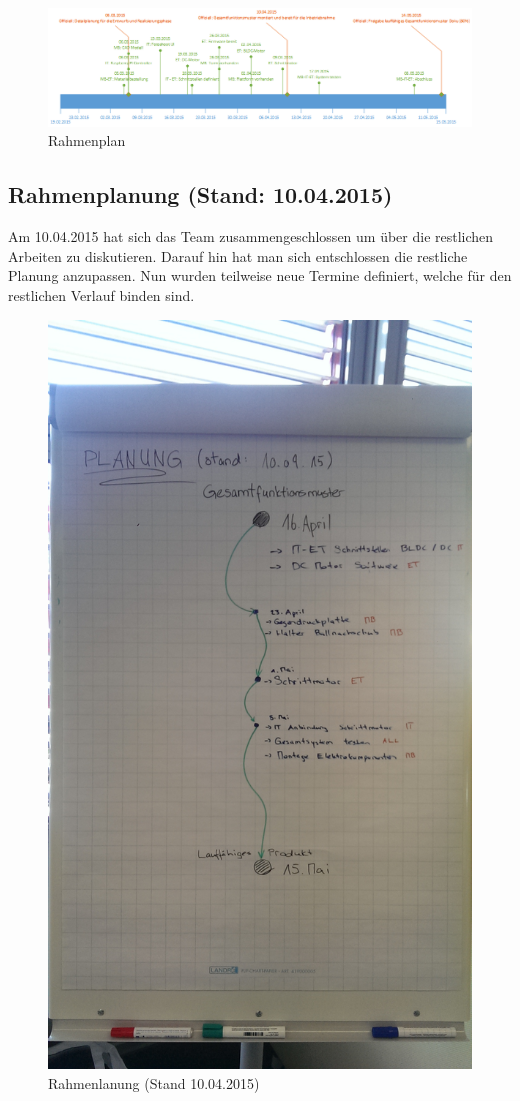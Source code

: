 \begin{landscape}
\begin{figure}
\centering
\includegraphics[width=1\linewidth]{../../fig/rahmenplanung}
\caption{Rahmenplan}
\label{fig:rahmenplanung}
\end{figure}
\end{landscape}

\subsection{Rahmenplanung (Stand: 10.04.2015)}
Am 10.04.2015 hat sich das Team zusammengeschlossen um über die restlichen Arbeiten zu diskutieren. Darauf hin hat man sich entschlossen die restliche Planung anzupassen. Nun wurden teilweise neue Termine definiert, welche für den restlichen Verlauf binden sind.

\begin{figure}[h!]
\centering
\includegraphics[width=0.6\linewidth]{../../fig/rahmenplanung-10042015}
\caption{Rahmenlanung (Stand 10.04.2015)}
\label{fig:rahmenplanung-10042015}
\end{figure}

